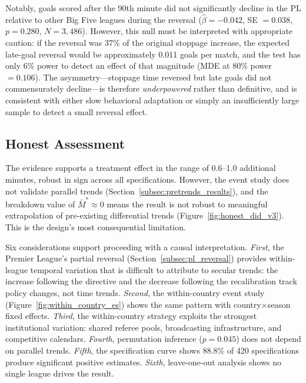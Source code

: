 \documentclass[12pt]{article}
\begin{document}
Notably, goals scored after the 90th minute did not significantly decline in the PL relative to other Big Five leagues during the reversal ($\hat{\beta} = -0.042$, SE $= 0.038$, $p = 0.280$, $N = 3{,}486$). However, this null must be interpreted with appropriate caution: if the reversal was 37\% of the original stoppage increase, the expected late-goal reversal would be approximately 0.011 goals per match, and the test has only 6\% power to detect an effect of that magnitude (MDE at 80\% power $= 0.106$). The asymmetry---stoppage time reversed but late goals did not commensurately decline---is therefore \emph{underpowered} rather than definitive, and is consistent with either slow behavioral adaptation or simply an insufficiently large sample to detect a small reversal effect.


\subsection{Honest Assessment}
\label{subsec:honest_assessment}

The evidence supports a treatment effect in the range of 0.6--1.0 additional minutes, robust in sign across all specifications. However, the event study does not validate parallel trends (Section~\ref{subsec:pretrends_results}), and the \citet{rambachan2023more} breakdown value of $\bar{M}^* \approx 0$ means the result is not robust to meaningful extrapolation of pre-existing differential trends (Figure~\ref{fig:honest_did_v3}). This is the design's most consequential limitation.

Six considerations support proceeding with a causal interpretation. \textit{First}, the Premier League's partial reversal (Section~\ref{subsec:pl_reversal}) provides within-league temporal variation that is difficult to attribute to secular trends: the increase following the directive and the decrease following the recalibration track policy changes, not time trends. \textit{Second}, the within-country event study (Figure~\ref{fig:within_country_es}) shows the same pattern with country$\times$season fixed effects. \textit{Third}, the within-country strategy exploits the strongest institutional variation: shared referee pools, broadcasting infrastructure, and competitive calendars. \textit{Fourth}, permutation inference ($p = 0.045$) does not depend on parallel trends. \textit{Fifth}, the specification curve shows 88.8\% of 420 specifications produce significant positive estimates. \textit{Sixth}, leave-one-out analysis shows no single league drives the result.
\end{document}
